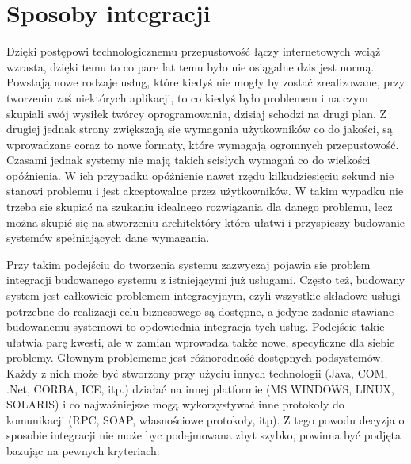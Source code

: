 \section{Sposoby integracji}
Dzięki postępowi technologicznemu przepustowość łączy internetowych wciąż wzrasta, dzięki temu to co pare lat temu było nie osiągalne dzis jest normą. Powstają nowe rodzaje usług, które kiedyś nie mogły by zostać zrealizowane, przy tworzeniu zaś niektórych aplikacji, to co kiedyś było problemem i na czym skupiali swój wysiłek twórcy oprogramowania, dzisiaj schodzi na drugi plan. Z drugiej jednak strony zwiększają sie wymagania użytkowników co do jakości, są wprowadzane coraz to nowe formaty, które wymagają ogromnych przepustowość. Czasami jednak systemy nie mają takich scisłych wymagań co do wielkości opóźnienia. W ich przypadku opóźnienie nawet rzędu kilkudziesięciu sekund nie stanowi problemu i jest akceptowalne przez użytkowników. W takim wypadku nie trzeba sie skupiać na szukaniu idealnego rozwiązania dla danego problemu, lecz można skupić się na stworzeniu architektóry która ułatwi i przyspieszy budowanie systemów spełniających dane wymagania.

Przy takim podejściu do tworzenia systemu zazwyczaj pojawia sie problem integracji budowanego systemu z istniejącymi już usługami. Często też, budowany system jest całkowicie problemem integracyjnym, czyli wszystkie składowe usługi potrzebne do realizacji celu biznesowego są dostępne, a jedyne zadanie stawiane budowanemu systemowi to opdowiednia integracja tych usług. Podejście takie ułatwia parę kwesti, ale w zamian wprowadza także nowe, specyficzne dla siebie problemy. Głownym problememe jest różnorodność dostępnych podsystemów. Każdy z nich może być stworzony przy użyciu innych technologii (Java, COM, .Net, CORBA, ICE, itp.) działać na innej platformie (MS WINDOWS, LINUX, SOLARIS) i co najważniejsze mogą wykorzystywać inne protokoły do komunikacji (RPC, SOAP, własnościowe protokoły, itp). Z tego powodu decyzja o sposobie integracji nie może byc podejmowana zbyt szybko,  powinna być podjęta bazując na pewnych kryteriach:  \cite{hohpewoolf2003} 

